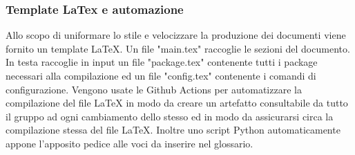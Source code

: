 	    \subsubsection{Template LaTex e automazione}
	    Allo scopo di uniformare lo stile e velocizzare la produzione dei documenti viene fornito un template LaTeX.
	    Un file "main.tex" raccoglie le sezioni del documento. In testa raccoglie in input un file "package.tex" contenente tutti i package necessari alla compilazione ed un file "config.tex" contenente i comandi di configurazione.
	    Vengono usate le Github Actions per automatizzare la compilazione del file LaTeX in modo da creare un artefatto consultabile da tutto il gruppo ad ogni cambiamento dello stesso ed in modo  da assicurarsi circa la compilazione stessa del file LaTeX. Inoltre uno script Python automaticamente appone l'apposito pedice alle voci da inserire nel glossario.
